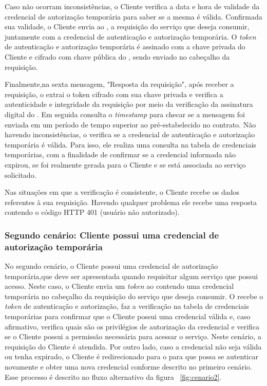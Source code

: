 Caso não ocorram inconsistências, o Cliente verifica a data e hora de validade da credencial de autorização temporária para saber se a mesma é válida. Confirmada sua validade, o Cliente envia ao \servidorRest{}, a requisição do serviço que deseja consumir, juntamente com a credencial de autenticação e autorização temporária. O \emph{token} de autenticação e autorização temporária é assinado com a chave privada do Cliente e cifrado com chave pública do \servidorRest{}, sendo enviado no cabeçalho da requisição.

Finalmente,na sexta mensagem, "Resposta da requisição", após receber a requisição, o \servidorRest{} extrai o token cifrado com sua chave privada e verifica a autenticidade e integridade da requisição por meio da verificação da assinatura digital do \servidorAA{}. Em seguida consulta o \emph{timestamp} para checar se a mensagem foi enviada em um período de tempo superior ao pré-estabelecido no contrato. Não havendo inconsistências, o \servidorRest{} verifica se a credencial de autenticação e autorização temporária é válida. Para isso, ele realiza uma consulta na tabela de credenciais temporárias, com a finalidade de confirmar se a credencial informada não expirou, se  foi realmente gerada para o Cliente e se está associada ao serviço solicitado.

Nas situações em que a verificação é consistente, o Cliente recebe os dados referentes à sua requisição.
Havendo qualquer problema ele recebe uma resposta contendo o código HTTP 401 (usuário não autorizado).


\subsubsection{Segundo cenário: Cliente possui uma credencial de autorização temporária}

No segundo cenário, o Cliente possui uma credencial de autorização temporária,que deve ser apresentada quando requisitar algum serviço que possui acesso.
Neste caso, o Cliente envia um \emph{token} ao \servidorRest{} contendo uma credencial temporária no cabeçalho da requisição do serviço que deseja consumir. O \servidorRest{} recebe o \emph{token} de autenticação e autorização, faz a verificação na tabela de credenciais temporárias para confirmar que o Cliente possui uma credencial válida e, caso afirmativo, verifica quais são os privilégios de autorização da credencial e verifica se o Cliente possui a permissão necessária para acessar o serviço. Neste cenário, a requisição do Cliente é atendida. Por outro lado, caso a credencial não seja válida ou tenha expirado, o Cliente é redirecionado para o \servidorAA{} para que possa se autenticar novamente e obter uma nova credencial conforme descrito no primeiro cenário. Esse processo é descrito no fluxo alternativo da figura ~\ref{fig:cenario2}.

